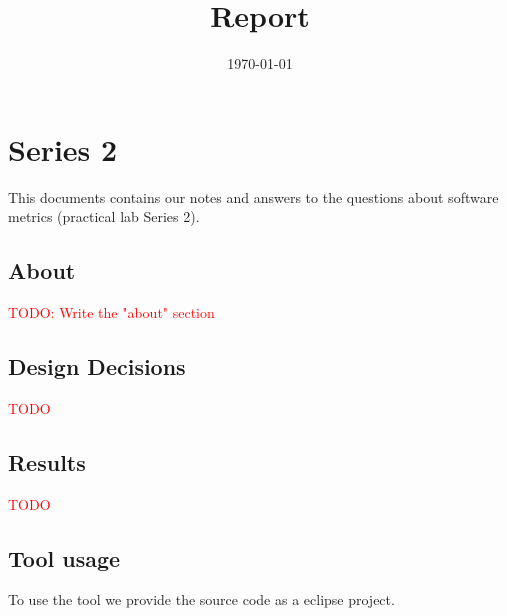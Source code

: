 \documentclass{uva-inf-article}
\title{Report}
\date{\today}
\newcommand\todo[1]{\textcolor{red}{#1}}
\begin{document}
\maketitle




\section{Series 2}

This documents contains our notes and answers to the questions about
software metrics (practical lab Series 2).

\subsection{About}

\todo{TODO: Write the "about" section}

\subsection{Design Decisions}

\todo{TODO}

\subsection{Results}

\todo{TODO}

\subsection{Tool usage}

To use the tool we provide the source code as a eclipse project.
\end{document}
